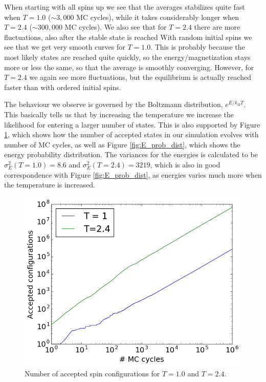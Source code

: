 \documentclass[12pt, a4paper]{article}
\begin{document}
When starting with all spins up we see that the averages stabilizes quite fast when $T=1.0$ 
($\sim 3,000$ MC cycles), while it takes considerably longer when $T=2.4$ ($\sim 300,000$ MC cycles).
We also see that for $T=2.4$ there are more fluctuations, also after the stable state is reached
With random initial spins we see that we get very smooth curves for $T=1.0$. This is probably because 
the most likely states are reached quite quickly, so the energy/magnetization stays more or less the 
same, so that the average is smoothly converging. However, for $T=2.4$ we again see more fluctuations, 
but the equilibrium is actually reached faster than with ordered initial spins. 

The behaviour we observe is governed by the Boltzmann distribution, $e^{E/k_BT}$. This basically tells 
us that by increasing the temperature we increase the likelihood for entering a larger number of 
states. This is also supported by Figure \ref{fig:Acc_confs}, which shows how the number of accepted 
states in our simulation evolves with number of MC cycles, as well as Figure \ref{fig:E_prob_dist}, 
which shows the energy probability distribution. The variances for the energies is calculated to 
be $\sigma_E^2(T=1.0)=8.6$ and $\sigma_E^2(T=2.4)=3219$, which is also in good correspondence with 
Figure \ref{fig:E_prob_dist}, as energies varies much more when the temperature is increased.     

\begin{figure}
\begin{center}
\includegraphics[scale=0.5]{../Programs/Output/Accepted_configurations.png}
\caption{Number of accepted spin configurations for $T=1.0$ and $T=2.4$.}
\label{fig:Acc_confs}
\end{center}
\end{figure}
\end{document}
